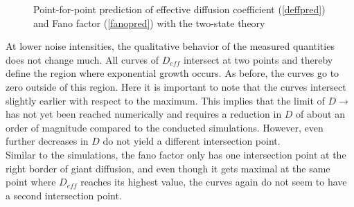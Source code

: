 \documentclass[12pt,a4paper]{article}
\begin{document}
\begin{figure}[H]
	\hspace*{-0.5cm}
	\caption{Point-for-point prediction of effective diffusion coefficient (\ref{deffpred}) and Fano factor (\ref{fanopred}) with the two-state theory}
\end{figure}
At lower noise intensities, the qualitative behavior of the measured quantities does not change much. All curves of $D_{eff}$ intersect at two points and thereby define the region where exponential growth occurs. As before, the curves go to zero outside of this region. Here it is important to note that the curves intersect slightly earlier with respect to the maximum. This implies that the limit of $D\rightarrow$ has not yet been reached numerically and requires a reduction in $D$ of about an order of magnitude compared to the conducted simulations. However, even further decreases in $D$ do not yield a different intersection point. \\
Similar to the simulations, the fano factor only has one intersection point at the right border of giant diffusion, and even though it gets maximal at the same point where $D_{eff}$ reaches its highest value, the curves again do not seem to have a second intersection point.
\end{document}
